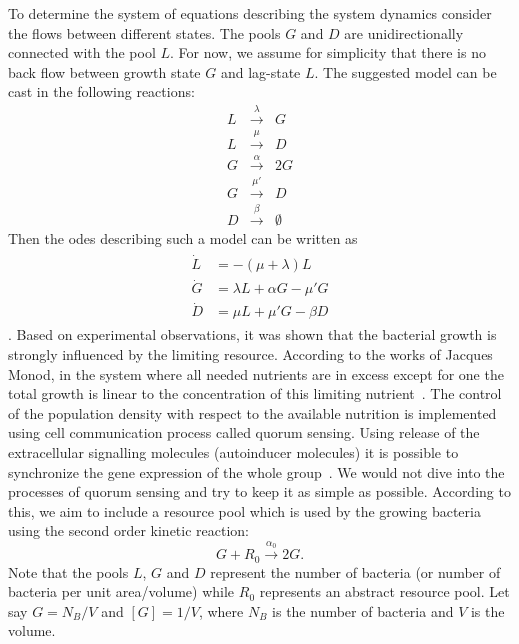 \documentclass[10pt,A4paper]{article}
\numberwithin{equation}{section}
\begin{document}
To determine the system of equations describing the system dynamics consider the flows between different states.
The pools $G$ and $D$ are unidirectionally connected with the pool $L$.
For now, we assume for simplicity that there is no back flow between growth state $G$ and lag-state $L$.
The suggested model can be cast in the following reactions:
\begin{eqnarray}
    L &\stackrel{\lambda}{\longrightarrow} & G\\
    L &\stackrel{\mu}{\longrightarrow} & D\\
    G &\stackrel{\alpha}{\longrightarrow} & 2G\\
    G &\stackrel{\mu'}{\longrightarrow} & D\\
    D &\stackrel{\beta}{\longrightarrow} & \emptyset
\end{eqnarray}
Then the \acp{ode} describing such a model can be written as
\begin{align}\begin{split}
    \dot{L} &= -(\mu + \lambda) L\\
    \dot{G} &= \lambda L + \alpha G - \mu' G\\
    \dot{D} &= \mu  L + \mu' G- \beta D  
\end{split}\end{align}.
%
Based on experimental observations, it was shown that the bacterial growth is strongly influenced by the limiting resource.
According to the works of Jacques Monod, in the system where all needed nutrients are in excess except for one the total growth is linear to the concentration of this limiting nutrient~\cite{monod_growth_1949}.
The control of the population density with respect to the available nutrition is implemented using cell communication process called quorum sensing.
Using release of the extracellular signalling molecules (autoinducer molecules) it is possible to synchronize the gene expression of the whole group~\cite{ng_bacterial_2009}.
We would not dive into the processes of quorum sensing and try to keep it as simple as possible.
According to this, we aim to include a resource pool which is used by the growing bacteria using the second order kinetic reaction:
\begin{equation}
    G + R_0  \stackrel{\alpha_0}{\longrightarrow} 2G.
\end{equation}
Note that the pools $L$, $G$ and $D$ represent the number of bacteria (or number of bacteria per unit area/volume) while $R_0$ represents an abstract resource pool.
Let say $G=N_B/V$ and $[G]=1/V$, where $N_B$ is the number of bacteria and $V$ is the volume.
\end{document}
